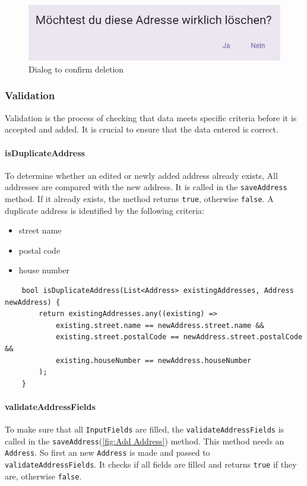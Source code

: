 \begin{figure}[H]
    \centering
    \includegraphics[width=0.6\linewidth]{images/AdminPanel/DeleteDialog.png}
    \caption{Dialog to confirm deletion}
\end{figure}

\subsubsection{Validation}
Validation is the process of checking that data meets specific criteria before it is accepted and added. It is crucial to ensure that the data entered is correct.
\paragraph{isDuplicateAddress}
To determine whether an edited or newly added address already exists, All addresses are compared with the new address. It is called in the \texttt{saveAddress} method.  If it already exists, the method returns \texttt{true}, otherwise \texttt{false}. A duplicate address is identified by the following criteria:
\begin{itemize}
    \item street name
    \item postal code
    \item house number
\end{itemize}

\lstset{style=mycsharp, caption=isDuplicateAddress method}
\begin{lstlisting}
    bool isDuplicateAddress(List<Address> existingAddresses, Address newAddress) {
        return existingAddresses.any((existing) =>
            existing.street.name == newAddress.street.name &&
            existing.street.postalCode == newAddress.street.postalCode &&
            existing.houseNumber == newAddress.houseNumber
        );
    }
\end{lstlisting}

\paragraph{validateAddressFields}
To make sure that all \texttt{InputFields} are filled, the \texttt{validateAddressFields} is called in the \texttt{saveAddress}(\ref{fig:Add Address}) method. This method needs an \texttt{Address}. So first an new \texttt{Address} is made and passed to \texttt{validateAddressFields}. It checks if all fields are filled and returns \texttt{true} if they are, otherwise \texttt{false}.

